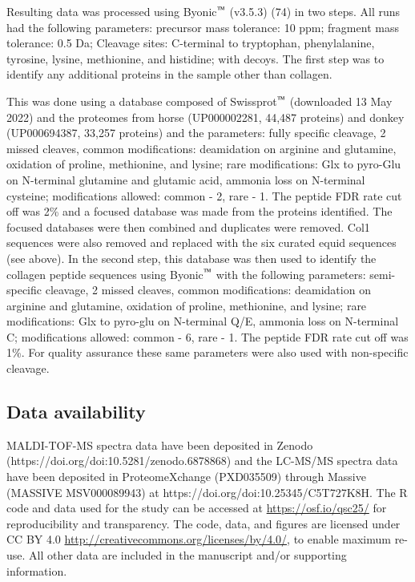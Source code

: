 \documentclass[preprint, 3p, authoryear]{elsarticle} %
\begin{document}
Resulting data was processed using Byonic\(^\text{\texttrademark}\) (v3.5.3) (74) in two steps. All runs had the following parameters: precursor mass tolerance: 10 ppm; fragment mass tolerance: 0.5 Da; Cleavage sites: C-terminal to tryptophan, phenylalanine, tyrosine, lysine, methionine, and histidine; with decoys. The first step was to identify any additional proteins in the sample other than collagen.

This was done using a database composed of Swissprot\(^\text{\texttrademark}\) (downloaded 13 May 2022) and the proteomes from horse (UP000002281, 44,487 proteins) and donkey (UP000694387, 33,257 proteins) and the parameters: fully specific cleavage, 2 missed cleaves, common modifications: deamidation on arginine and glutamine, oxidation of proline, methionine, and lysine; rare modifications: Glx to pyro-Glu on N-terminal glutamine and glutamic acid, ammonia loss on N-terminal cysteine; modifications allowed: common - 2, rare - 1. The peptide FDR rate cut off was 2\% and a focused database was made from the proteins identified. The focused databases were then combined and duplicates were removed. Col1 sequences were also removed and replaced with the six curated equid sequences (see above). In the second step, this database was then used to identify the collagen peptide sequences using Byonic\(^\text{\texttrademark}\) with the following parameters: semi-specific cleavage, 2 missed cleaves, common modifications: deamidation on arginine and glutamine, oxidation of proline, methionine, and lysine; rare modifications: Glx to pyro-glu on N-terminal Q/E, ammonia loss on N-terminal C; modifications allowed: common - 6, rare - 1. The peptide FDR rate cut off was 1\%. For quality assurance these same parameters were also used with non-specific cleavage.

\hypertarget{data-availability}{%
\subsection{Data availability}\label{data-availability}}

MALDI-TOF-MS spectra data have been deposited in Zenodo (https://doi.org/doi:10.5281/zenodo.6878868) and the LC-MS/MS spectra data have been deposited in ProteomeXchange (PXD035509) through Massive (MASSIVE MSV000089943) at https://doi.org/doi:10.25345/C5T727K8H. The R code and data used for the study can be accessed at \url{https://osf.io/qsc25/} for reproducibility and transparency. The code, data, and figures are licensed under CC BY 4.0 \url{http://creativecommons.org/licenses/by/4.0/}, to enable maximum re-use. All other data are included in the manuscript and/or supporting information.
\end{document}
